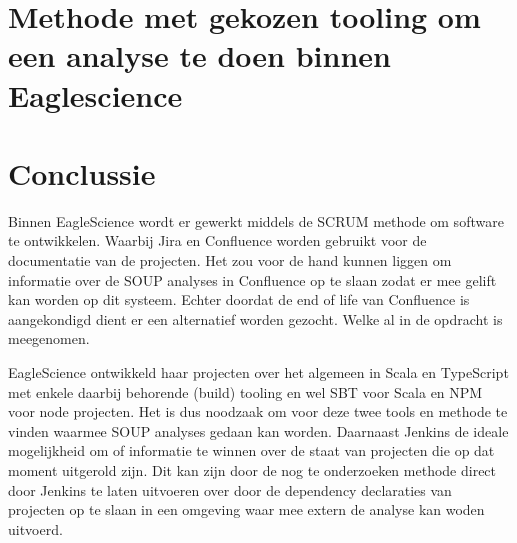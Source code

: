 %
%
\section{Methode met gekozen tooling om een analyse te doen binnen Eaglescience}\label{sec:methode}

\section{Conclussie}\label{sec:ESconclussie}
Binnen EagleScience wordt er gewerkt middels de SCRUM methode om software te ontwikkelen. Waarbij Jira en Confluence worden gebruikt voor de documentatie van de projecten. Het zou voor de hand kunnen liggen om informatie over de SOUP analyses in Confluence op te slaan zodat er mee gelift kan worden op dit systeem. Echter doordat de end of life van Confluence is aangekondigd dient er een alternatief worden gezocht. Welke al in de opdracht is meegenomen.

EagleScience ontwikkeld haar projecten over het algemeen in Scala en TypeScript met enkele daarbij behorende (build) tooling en wel SBT voor Scala en NPM voor node projecten. Het is dus noodzaak om voor deze twee tools en methode te vinden waarmee SOUP analyses gedaan kan worden. Daarnaast Jenkins de ideale mogelijkheid om of informatie te winnen over de staat van projecten die op dat moment uitgerold zijn. Dit kan zijn door de nog te onderzoeken methode direct door Jenkins te laten uitvoeren over door de dependency declaraties van projecten op te slaan in een omgeving waar mee extern de analyse kan woden uitvoerd.
